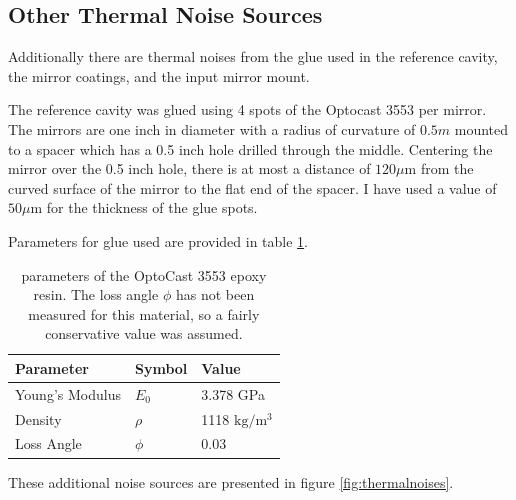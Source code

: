 \subsection{Other Thermal Noise Sources}

Additionally there are thermal noises from the glue used in the reference
cavity, the mirror coatings, and the input mirror mount.

The reference cavity was glued using 4 spots of the Optocast 3553 per mirror.
The mirrors are one inch in diameter with a radius of curvature of $0.5m$
mounted to a spacer which has a 0.5 inch hole drilled through the middle.
Centering the mirror over the 0.5 inch hole, there is at most a distance of
$120 \mu\mathrm{m}$ from the curved surface of the mirror to the flat end
of the spacer.
I have used a value of $50 \mu\mathrm{m}$ for the thickness of the glue spots.

Parameters for glue used are provided in table
\ref{tab:epoxyparams}.


\begin{table}
  \begin{center}
    \small
    \begin{tabular}{|l|l|l|}
      \hline
      Parameter & Symbol & Value \\
      \hline
      \hline
      Young's Modulus & $E_0$ & 3.378 GPa \\
      \hline
      Density & $\rho$ & 1118 $\mathrm{kg/m^3}$ \\
      \hline
      Loss Angle & $\phi$ & 0.03 \\
      \hline
    \end{tabular}
  \end{center}
  \caption[Epoxy Parameters]{
      parameters of the OptoCast 3553 epoxy resin.
      The loss angle $\phi$ has not been measured for this material,
      so a fairly conservative value was assumed.
      }
  \label{tab:epoxyparams}
\end{table}

These additional noise sources are presented in figure \ref{fig:thermalnoises}.

